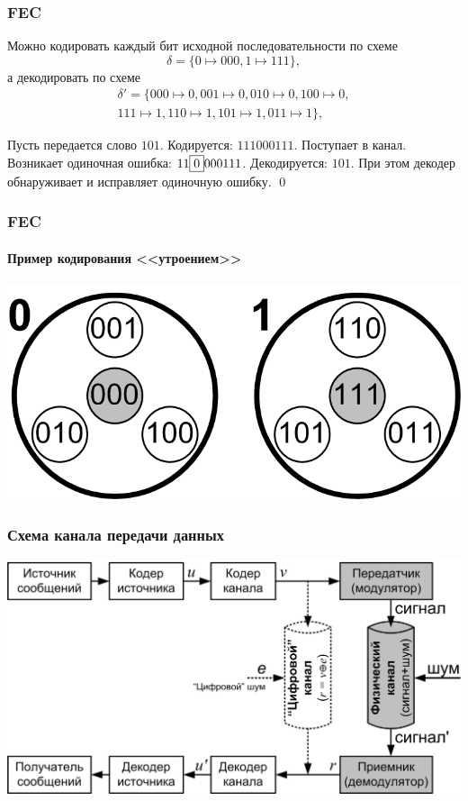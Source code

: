 \begin{frame}
    \frametitle{FEC}
    
    Можно кодировать каждый бит исходной последовательности по схеме
    \[\delta=\{0\mapsto 000, 1\mapsto 111\},\]
    а декодировать по схеме
    \[
        \begin{split}
            \delta'=\{
                000\mapsto 0,001\mapsto 0,010\mapsto 0,100\mapsto 0,\\
                111\mapsto 1,110\mapsto 1,101\mapsto 1,011\mapsto 1
            \},
        \end{split}
    \]
    \begin{example}
        Пусть передается слово $101$. Кодируется: $111000111$. Поступает в канал. Возникает одиночная ошибка: $11\fbox{$0$}000111$. Декодируется: $101$. При этом декодер обнаруживает и исправляет одиночную ошибку. \qed
    \end{example}
\end{frame}

\begin{frame}
    \frametitle{FEC}
    \framesubtitle{Пример кодирования <<утроением>>}
    
    \begin{center}
        \includegraphics[width=.8\textwidth]{fig/fecTriplet} 
    \end{center}
\end{frame}

\begin{frame}
    \frametitle{Схема канала передачи данных}
    
    \begin{center}
        \includegraphics[width=.9\textwidth]{fig/channel} 
    \end{center}
\end{frame}

